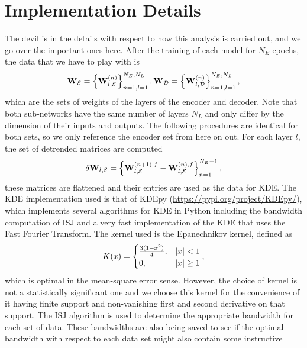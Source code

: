 \section{Implementation Details}
The devil is in the details with respect to how this analysis is carried out, and we
go over the important ones here. After the training of each model for $N_E$ epochs, the 
data that we have to play with is 
\begin{equation}
    {\bf W}_\mathcal{E} = \left\{{\bf W}_{l,\mathcal{E}}^{(n)}\right\}_{n=1, l=1}^{N_E, N_L}, 
    {\bf W}_\mathcal{D} = \left\{{\bf W}_{l,\mathcal{D}}^{(n)}\right\}_{n=1, l=1}^{N_E, N_L}, 
\end{equation}
which are the sets of weights of the layers of the encoder and decoder. Note that both sub-networks 
have the same number of layers $N_L$ and only differ by the dimension of their inputs and outputs.
The following procedures are identical for both sets, so we only reference the encoder set
from here on out. For each layer $l$, the set of detrended matrices are computed
\begin{equation}
    \delta{\bf W}_{l, \mathcal{E}} = \left\{{\bf W}_{l,\mathcal{E}}^{(n+1),f} - {\bf W}_{l,\mathcal{E}}^{(n),f}\right\}_{n=1}^{N_E-1},
\end{equation}
these matrices are flattened and their entries are used as the data for KDE. The KDE implementation
used is that of KDEpy (\href{https://pypi.org/project/KDEpy/}{https://pypi.org/project/KDEpy/}), which implements several 
algorithms for KDE in Python including the bandwidth computation of ISJ and a very fast implementation
of the KDE that uses the Fast Fourier Transform. The kernel used is the Epanechnikov kernel, defined as 
\begin{equation}
    K(x) = 
    \begin{cases}
        \frac{3(1-x^2)}{4}, & \left|x\right| < 1 \\
        0, & \left|x\right| \geq 1
    \end{cases},\label{eqn:epanechnikov}
\end{equation}
which is optimal in the mean-square error sense. However, the choice of kernel is not a statistically 
significant one \cite{epanechnikov} and we choose this kernel for the convenience of it having finite 
support and non-vanishing first and second derivative on that support. The ISJ algorithm is used to 
determine the appropriate bandwidth for each set of data. These bandwidths are also being saved to 
see if the optimal bandwidth with respect to each data set might also contain some instructive 
